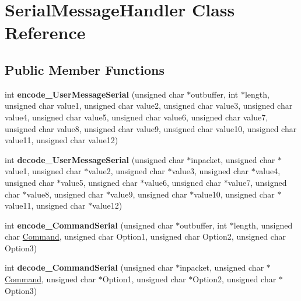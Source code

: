 \hypertarget{classSerialMessageHandler}{}\section{Serial\+Message\+Handler Class Reference}
\label{classSerialMessageHandler}
\subsection*{Public Member Functions}
\begin{DoxyCompactItemize}
\item 
\mbox{\label{classSerialMessageHandler_ace3a580615d169b5ed605c39e540f63d}} 
int {\bfseries encode\+\_\+\+User\+Message\+Serial} (unsigned char $\ast$outbuffer, int $\ast$length, unsigned char value1, unsigned char value2, unsigned char value3, unsigned char value4, unsigned char value5, unsigned char value6, unsigned char value7, unsigned char value8, unsigned char value9, unsigned char value10, unsigned char value11, unsigned char value12)
\item 
\mbox{\label{classSerialMessageHandler_a5640f04e00397185eb0c6c00c79a0833}} 
int {\bfseries decode\+\_\+\+User\+Message\+Serial} (unsigned char $\ast$inpacket, unsigned char $\ast$value1, unsigned char $\ast$value2, unsigned char $\ast$value3, unsigned char $\ast$value4, unsigned char $\ast$value5, unsigned char $\ast$value6, unsigned char $\ast$value7, unsigned char $\ast$value8, unsigned char $\ast$value9, unsigned char $\ast$value10, unsigned char $\ast$value11, unsigned char $\ast$value12)
\item 
\mbox{\label{classSerialMessageHandler_a7df4a5438371c97bba23695492c0c627}} 
int {\bfseries encode\+\_\+\+Command\+Serial} (unsigned char $\ast$outbuffer, int $\ast$length, unsigned char \hyperlink{structCommand}{Command}, unsigned char Option1, unsigned char Option2, unsigned char Option3)
\item 
\mbox{\label{classSerialMessageHandler_a3ab1541f92a9117e5f988d0fb5fb766b}} 
int {\bfseries decode\+\_\+\+Command\+Serial} (unsigned char $\ast$inpacket, unsigned char $\ast$\hyperlink{structCommand}{Command}, unsigned char $\ast$Option1, unsigned char $\ast$Option2, unsigned char $\ast$Option3)

\end{DoxyCompactItemize}
